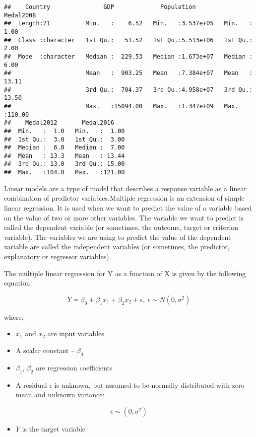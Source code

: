 \documentclass[
]{article}
\providecommand{\tightlist}{%
  \setlength{\itemsep}{0pt}\setlength{\parskip}{0pt}}
\begin{document}
\begin{verbatim}
##    Country               GDP             Population          Medal2008     
##  Length:71          Min.   :    6.52   Min.   :3.537e+05   Min.   :  1.00  
##  Class :character   1st Qu.:   51.52   1st Qu.:5.513e+06   1st Qu.:  2.00  
##  Mode  :character   Median :  229.53   Median :1.673e+07   Median :  6.00  
##                     Mean   :  903.25   Mean   :7.384e+07   Mean   : 13.11  
##                     3rd Qu.:  704.37   3rd Qu.:4.958e+07   3rd Qu.: 13.50  
##                     Max.   :15094.00   Max.   :1.347e+09   Max.   :110.00  
##    Medal2012       Medal2016     
##  Min.   :  1.0   Min.   :  1.00  
##  1st Qu.:  3.0   1st Qu.:  3.00  
##  Median :  6.0   Median :  7.00  
##  Mean   : 13.3   Mean   : 13.44  
##  3rd Qu.: 13.0   3rd Qu.: 15.00  
##  Max.   :104.0   Max.   :121.00
\end{verbatim}

Linear models are a type of model that describes a response variable as
a linear combination of predictor variables.Multiple regression is an
extension of simple linear regression. It is used when we want to
predict the value of a variable based on the value of two or more other
variables. The variable we want to predict is called the dependent
variable (or sometimes, the outcome, target or criterion variable). The
variables we are using to predict the value of the dependent variable
are called the independent variables (or sometimes, the predictor,
explanatory or regressor variables).

The multiple linear regression for Y as a function of X is given by the
following equation:

\[Y = \beta_0 + \beta_1 x_1 + \beta_2 x_2 + \epsilon, \ \epsilon \sim N(0, \sigma^2)\]

where,

\begin{itemize}
\tightlist
\item
  \(x_1\) and \(x_2\) are input variables
\item
  A scalar constant -- \(\beta_0\)
\item
  \(\beta_1\), \(\beta_2\) are regression coefficients
\item
  A residual \(\epsilon\) is unknown, but assumed to be normally
  distributed with zero mean and unknown variance:
\end{itemize}

\[\epsilon \sim(0, \sigma^2)\]

\begin{itemize}
\tightlist
\item
  \(Y\) is the target variable
\end{itemize}
\end{document}
